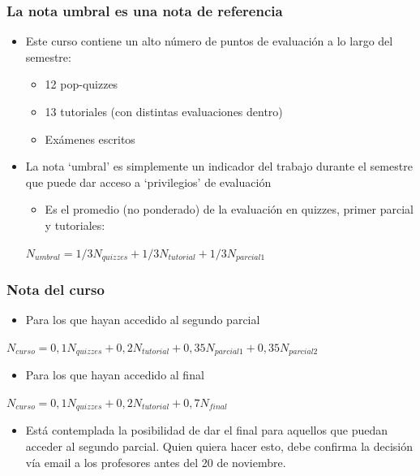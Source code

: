 \documentclass[14pt]{beamer}
\begin{document}
\begin{frame}
\frametitle{La nota umbral es una nota de referencia}
\begin{itemize}
    \item Este curso contiene un alto número de puntos de evaluación a lo largo del semestre:
        \begin{itemize}
            \item 12 pop-quizzes
            \item 13 tutoriales (con distintas evaluaciones dentro)
            \item Exámenes escritos
        \end{itemize}
    \item La nota ‘umbral’ es simplemente un indicador del trabajo durante el semestre que puede dar acceso a ‘privilegios’ de evaluación
        \begin{itemize}
            \item Es el promedio (no ponderado) de la evaluación en quizzes, primer parcial y tutoriales:  
        \end{itemize}
        $N_{umbral}=1/3N_{quizzes}+1/3N_{tutorial}+1/3N_{parcial 1}$
\end{itemize}
\end{frame}

\begin{frame}
\frametitle{Nota del curso}
\begin{itemize}
    \item Para los que hayan accedido al segundo parcial 
\end{itemize}
\small{$N_{curso}=0,1N_{quizzes}+0,2N_{tutorial}+0,35N_{parcial 1}+0,35N_{parcial 2}$}
\vspace{2mm}
\begin{itemize}
    \item Para los que hayan accedido al final
\end{itemize}
\small{$N_{curso}=0,1N_{quizzes}+0,2N_{tutorial}+0,7N_{final}$}
\vspace{2mm}
\begin{itemize}
    \item Está contemplada la posibilidad de dar el final para aquellos que puedan acceder al segundo parcial. Quien quiera hacer esto, debe confirma la decisión vía email a los profesores antes del 20 de noviembre.
\end{itemize}
\end{frame}
\end{document}
